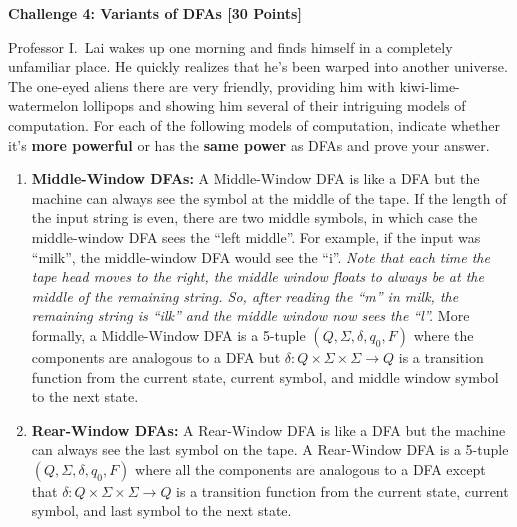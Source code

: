 \documentclass[12pt]{article}
\newcommand{\Problem}[3]{\mbox{} \newline \noindent \textbf{\textbf{Challenge #1: #2 [#3 Points] \\ }}}
\begin{document}
\Problem{4}{Variants of DFAs}{30}

Professor I.~Lai wakes up one morning and finds himself in a completely unfamiliar place.  He quickly realizes that he's been warped into another universe.  The one-eyed aliens there are very friendly, providing him with kiwi-lime-watermelon lollipops and showing him several of their intriguing models of computation.  For each of the following models of computation, indicate whether it's \textbf{more powerful} or has the \textbf{same power} as DFAs and prove your answer.  
	
\begin{enumerate}

	\item \textbf{Middle-Window DFAs:}  A Middle-Window DFA is like a DFA but the machine can always see the symbol at the middle of the tape.  If the length of the input string is even, there are two middle symbols, in which case the middle-window DFA sees the ``left middle''.  For example, if the input was ``milk'', the middle-window DFA would see the ``i''.  \emph{Note that each time the tape head moves to the right, the middle window floats to always be at the middle of the remaining string.  So, after reading the ``m'' in milk, the remaining string is ``ilk'' and the middle window now sees the ``l''.}  More formally, a Middle-Window DFA is a 5-tuple $(Q, \Sigma, \delta, q_0, F)$ where the components are analogous to a DFA but $\delta: Q \times \Sigma \times \Sigma \rightarrow Q$ is a transition function from the current state, current symbol, and middle window symbol to the next state.
	
	\item \textbf{Rear-Window DFAs:}  A Rear-Window DFA is like a DFA but the machine can always see the last symbol on the tape. A  Rear-Window DFA is a 
	5-tuple $(Q, \Sigma, \delta, q_0, F)$ where all the components are analogous to a DFA except that $\delta:  Q \times \Sigma \times \Sigma \rightarrow Q$ is a transition function from the current state, current symbol, and last symbol to the next state.
		
\end{enumerate}
\end{document}
